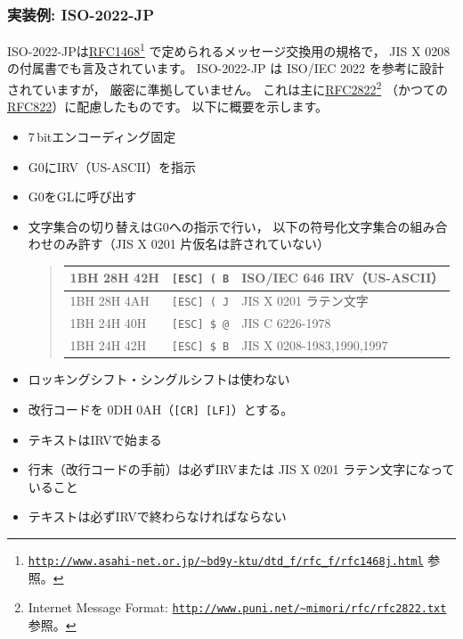 \documentclass[a4j,10pt,fleqn]{jsarticle}
\begin{document}
\subsubsection{実装例: ISO-2022-JP} \label{sec:iso-2022-jp}

ISO-2022-JPは\href{ftp://ftp.isi.edu/in-notes/rfc1468.txt}{RFC1468}\footnote{
    \href{http://www.asahi-net.or.jp/~bd9y-ktu/dtd_f/rfc_f/rfc1468j.html}{\texttt{http://www.asahi-net.or.jp/\~{}bd9y-ktu/dtd\_f/rfc\_f/rfc1468j.html}} 参照。
} で定められるメッセージ交換用の規格で，
JIS X 0208 の付属書でも言及されています。
ISO-2022-JP は ISO/IEC 2022 を参考に設計されていますが，
厳密に準拠していません。
これは主に\href{ftp://ftp.isi.edu/in-notes/rfc2822.txt}{RFC2822}\footnote{
    Internet Message Format: \href{http://www.puni.net/~mimori/rfc/rfc2822.txt}{\texttt{http://www.puni.net/\~{}mimori/rfc/rfc2822.txt}} 参照。
} （かつての\href{ftp://ftp.isi.edu/in-notes/rfc822.txt}{RFC822}）に配慮したものです。
以下に概要を示します。
\begin{itemize}
\item 7\,bitエンコーディング固定
\item G0にIRV（US-ASCII）を指示
\item G0をGLに呼び出す
\item 文字集合の切り替えはG0への指示で行い，
    以下の符号化文字集合の組み合わせのみ許す（JIS X 0201 片仮名は許されていない）
    \begin{quote}\begin{tabular}{|l|l||l|}
        \hline
        1BH 28H 42H & \texttt{[ESC] ( B}  & ISO/IEC 646 IRV（US-ASCII） \\ \hline
        1BH 28H 4AH & \texttt{[ESC] ( J}  & JIS X 0201 ラテン文字 \\ \hline
        1BH 24H 40H & \texttt{[ESC] \$ @} & JIS C 6226-1978 \\ \hline
        1BH 24H 42H & \texttt{[ESC] \$ B} & JIS X 0208-1983,1990,1997 \\ \hline
    \end{tabular}\end{quote}
\item ロッキングシフト・シングルシフトは使わない
\item 改行コードを 0DH 0AH（\texttt{[CR] [LF]}）とする。
\item テキストはIRVで始まる
\item 行末（改行コードの手前）は必ずIRVまたは JIS X 0201 ラテン文字になっていること
\item テキストは必ずIRVで終わらなければならない
\end{itemize}
\end{document}
